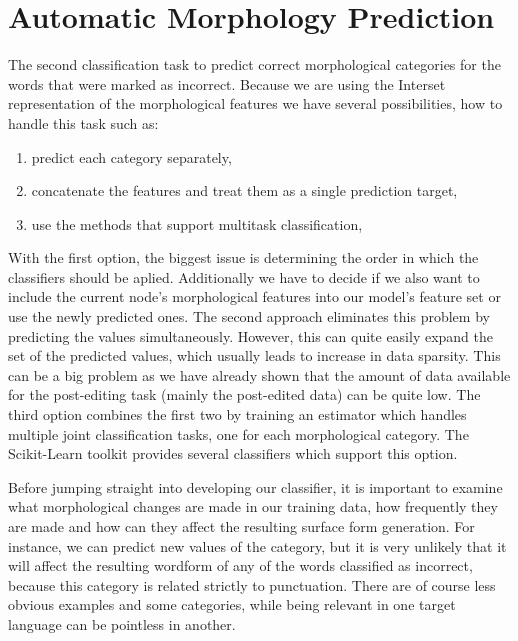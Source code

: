 \section{Automatic Morphology Prediction}

The second classification task to predict correct morphological categories for
the words that were marked as incorrect. Because we are using the Interset representation
of the morphological features we have several possibilities, how to handle this task such
as:
\begin{enumerate}
    \item predict each category separately,
    \item concatenate the features and treat them as a single prediction target,
    \item use the methods that support multitask classification,
\end{enumerate}

With the first option, the biggest issue is determining the order in which the classifiers
should be aplied. Additionally we have to decide if we also want to include the current node's morphological features
into our model's feature set or use the newly predicted ones. The second approach eliminates this problem by predicting the
values simultaneously. However, this can quite easily expand the set of the predicted values,
which usually leads to increase in data sparsity. This can be a big problem as we have
already shown that the amount of data available for the post-editing task (mainly the post-edited
data) can be quite low. The third option combines the first two by training an estimator
which handles multiple joint classification tasks, one for each morphological category. The
Scikit-Learn toolkit provides several classifiers which support this option.

Before jumping straight into developing our classifier, it is important to examine what morphological
changes are made in our training data, how frequently they are made and how can they affect the resulting
surface form generation. For instance, we can predict new values of the  category,
but it is very unlikely that it will affect the resulting wordform of any of the words
classified as incorrect, because this category is related strictly to punctuation. There are
of course less obvious examples and some categories, while being relevant in one target language
can be pointless in another.

